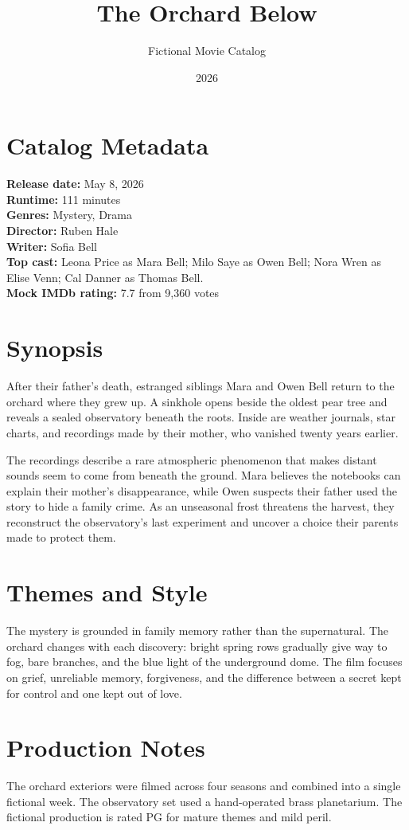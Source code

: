 \documentclass[11pt]{article}
\title{The Orchard Below}
\author{Fictional Movie Catalog}
\date{2026}
\begin{document}
\maketitle

\section*{Catalog Metadata}
\textbf{Release date:} May 8, 2026\\
\textbf{Runtime:} 111 minutes\\
\textbf{Genres:} Mystery, Drama\\
\textbf{Director:} Ruben Hale\\
\textbf{Writer:} Sofia Bell\\
\textbf{Top cast:} Leona Price as Mara Bell; Milo Saye as Owen Bell;
Nora Wren as Elise Venn; Cal Danner as Thomas Bell.\\
\textbf{Mock IMDb rating:} 7.7 from 9,360 votes

\section*{Synopsis}
After their father's death, estranged siblings Mara and Owen Bell return to the
orchard where they grew up. A sinkhole opens beside the oldest pear tree and
reveals a sealed observatory beneath the roots. Inside are weather journals,
star charts, and recordings made by their mother, who vanished twenty years
earlier.

The recordings describe a rare atmospheric phenomenon that makes distant
sounds seem to come from beneath the ground. Mara believes the notebooks can
explain their mother's disappearance, while Owen suspects their father used the
story to hide a family crime. As an unseasonal frost threatens the harvest,
they reconstruct the observatory's last experiment and uncover a choice their
parents made to protect them.

\section*{Themes and Style}
The mystery is grounded in family memory rather than the supernatural. The
orchard changes with each discovery: bright spring rows gradually give way to
fog, bare branches, and the blue light of the underground dome. The film
focuses on grief, unreliable memory, forgiveness, and the difference between a
secret kept for control and one kept out of love.

\section*{Production Notes}
The orchard exteriors were filmed across four seasons and combined into a
single fictional week. The observatory set used a hand-operated brass
planetarium. The fictional production is rated PG for mature themes and mild
peril.
\end{document}
